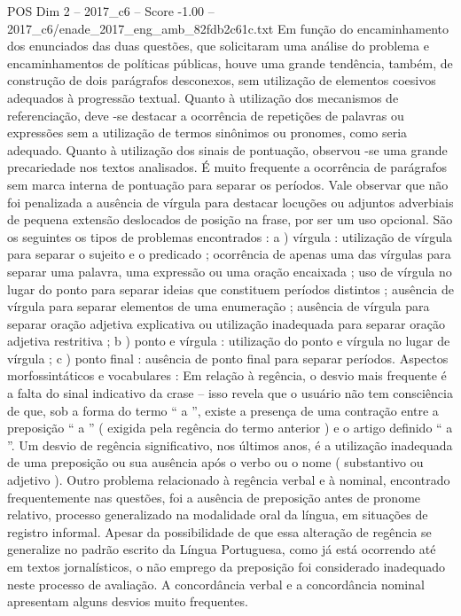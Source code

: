 \begin{textsample}{POS Dim 2 – 2017\_c6 – Score -1.00 – 2017\_c6/enade\_2017\_eng\_amb\_82fdb2c61c.txt}
Em função do encaminhamento dos enunciados das duas questões, que solicitaram uma análise do problema e encaminhamentos de políticas públicas, houve uma grande tendência, também, de construção de dois parágrafos desconexos, sem utilização de elementos coesivos adequados à progressão textual.
Quanto à utilização dos mecanismos de referenciação, deve -se destacar a ocorrência de repetições de palavras ou expressões sem a utilização de termos sinônimos ou pronomes, como seria adequado.
Quanto à utilização dos sinais de pontuação, observou -se uma grande precariedade nos textos analisados.
É muito frequente a ocorrência de parágrafos sem marca interna de pontuação para separar os períodos.
Vale observar que não foi penalizada a ausência de vírgula para destacar locuções ou adjuntos adverbiais de pequena extensão deslocados de posição na frase, por ser um uso opcional.
São os seguintes os tipos de problemas encontrados : a ) vírgula : utilização de vírgula para separar o sujeito e o predicado ; ocorrência de apenas uma das vírgulas para separar uma palavra, uma expressão ou uma oração encaixada ; uso de vírgula no lugar do ponto para separar ideias que constituem períodos distintos ; ausência de vírgula para separar elementos de uma enumeração ; ausência de vírgula para separar oração adjetiva explicativa ou utilização inadequada para separar oração adjetiva restritiva ; b ) ponto e vírgula : utilização do ponto e vírgula no lugar de vírgula ; c ) ponto final : ausência de ponto final para separar períodos.
Aspectos morfossintáticos e vocabulares : Em relação à regência, o desvio mais frequente é a falta do sinal indicativo da crase – isso revela que o usuário não tem consciência de que, sob a forma do termo “ a ”, existe a presença de uma contração entre a preposição “ a ” ( exigida pela regência do termo anterior ) e o artigo definido “ a ”.
Um desvio de regência significativo, nos últimos anos, é a utilização inadequada de uma preposição ou sua ausência após o verbo ou o nome ( substantivo ou adjetivo ).
Outro problema relacionado à regência verbal e à nominal, encontrado frequentemente nas questões, foi a ausência de preposição antes de pronome relativo, processo generalizado na modalidade oral da língua, em situações de registro informal.
Apesar da possibilidade de que essa alteração de regência se generalize no padrão escrito da Língua Portuguesa, como já está ocorrendo até em textos jornalísticos, o não emprego da preposição foi considerado inadequado neste processo de avaliação.
A concordância verbal e a concordância nominal apresentam alguns desvios muito frequentes.

\end{textsample}
